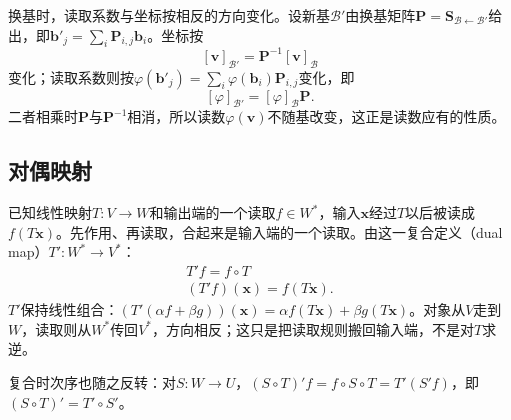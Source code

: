 换基时，读取系数与坐标按相反的方向变化。设新基$\mathcal B'$由换基矩阵$\bm P=\bm S_{\mathcal B\leftarrow\mathcal B'}$给出，即$\bm b'_j=\sum_i\bm P_{i,j}\bm b_i$。坐标按
\[
 [\bm v]_{\mathcal B'}=\bm P^{-1}[\bm v]_{\mathcal B}
\]
变化；读取系数则按$\varphi(\bm b'_j)=\sum_i\varphi(\bm b_i)\bm P_{i,j}$变化，即
\[
 [\varphi]_{\mathcal B'}=[\varphi]_{\mathcal B}\bm P.
\]
二者相乘时$\bm P$与$\bm P^{-1}$相消，所以读数$\varphi(\bm v)$不随基改变，这正是读数应有的性质。

\subsection{对偶映射}
\label{sec:ls-dual-map}

已知线性映射$T:V\to W$和输出端的一个读取$f\in W^*$，输入$\bm x$经过$T$以后被读成$f(T\bm x)$。先作用、再读取，合起来是输入端的一个读取。由这一复合定义（dual map）$T':W^*\to V^*$：
\begin{equation}
\begin{gathered}
T'f=f\circ T\\
(T'f)(\bm x)=f(T\bm x).
\end{gathered}
\label{eq:ls-dual-map-def}
\end{equation}
$T'$保持线性组合：$(T'(\alpha f+\beta g))(\bm x)=\alpha f(T\bm x)+\beta g(T\bm x)$。对象从$V$走到$W$，读取则从$W^*$传回$V^*$，方向相反；这只是把读取规则搬回输入端，不是对$T$求逆。

复合时次序也随之反转：对$S:W\to U$，$(S\circ T)'f=f\circ S\circ T=T'(S'f)$，即$(S\circ T)'=T'\circ S'$。

